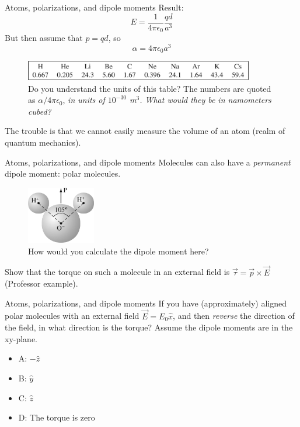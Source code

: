\documentclass{beamer}
\begin{document}
\begin{frame}{Atoms, polarizations, and dipole moments}
Result:
\begin{equation}
E = \frac{1}{4\pi \epsilon_0}\frac{qd}{a^3}
\end{equation}
But then assume that $p = qd$, so
\begin{equation}
\alpha = 4\pi\epsilon_0 a^3
\end{equation}
\begin{figure}
\centering
\includegraphics[width=10cm]{figures/tab4_1.jpg}
\caption{\label{tab:alpha} Do you understand the units of this table?  The numbers are quoted as $\alpha/4\pi\epsilon_0$, \textit{in units of $10^{-30}$ m$^3$.  What would they be in namometers cubed?}}
\end{figure}
The trouble is that we cannot easily measure the volume of an atom (realm of quantum mechanics).
\end{frame}

\begin{frame}{Atoms, polarizations, and dipole moments}
Molecules can also have a \textit{permanent} dipole moment: polar molecules.
\begin{figure}
\centering
\includegraphics[width=3cm]{figures/4_4.jpg}
\caption{\label{fig:water} How would you calculate the dipole moment here?}
\end{figure}
Show that the torque on such a molecule in an external field is $\vec{\tau} = \vec{p} \times \vec{E}$ (Professor example).
\end{frame}

\begin{frame}{Atoms, polarizations, and dipole moments}
If you have (approximately) aligned polar molecules with an external field $\vec{E} = E_0 \hat{x}$, and then \textit{reverse} the direction of the field, in what direction is the torque?  Assume the dipole moments are in the xy-plane.
\begin{itemize}
\item A: $-\hat{z}$
\item B: $\hat{y}$
\item C: $\hat{z}$
\item D: The torque is zero
\end{itemize}
\end{frame}
\end{document}
